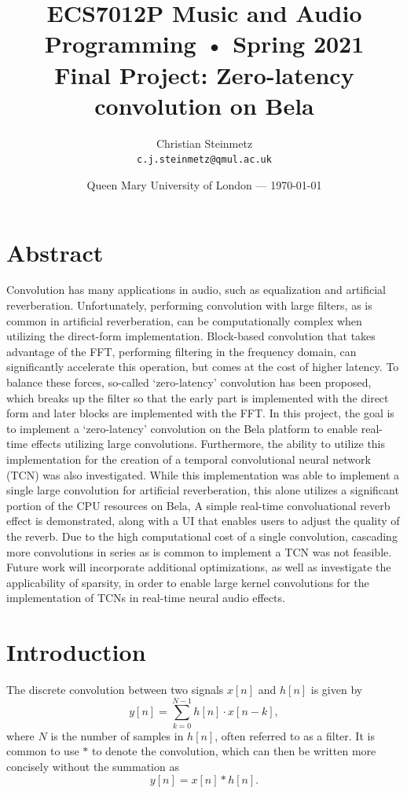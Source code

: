 \documentclass{article}
\title{ \large ECS7012P Music and Audio Programming • Spring 2021 \\ \huge Final Project: Zero-latency convolution on Bela} %
\author{Christian Steinmetz\\ \texttt{c.j.steinmetz@qmul.ac.uk}} %
\date{Queen Mary University of London --- \today} %
\begin{document}
  

\maketitle %

\section*{Abstract} 

Convolution has many applications in audio, such as equalization and artificial reverberation.
Unfortunately, performing convolution with large filters, as is common in artificial reverberation, 
can be computationally complex when utilizing the direct-form implementation. 
Block-based convolution that takes advantage of the FFT, performing filtering in the frequency domain,
can significantly accelerate this operation, but comes at the cost of higher latency. 
To balance these forces, so-called `zero-latency' convolution has been proposed,
which breaks up the filter so that the early part is implemented with the direct form and later blocks are implemented with the FFT. 
In this project, the goal is to implement a `zero-latency' convolution on the Bela platform to enable real-time effects utilizing large convolutions. 
Furthermore, the ability to utilize this implementation for the creation of a temporal convolutional neural network (TCN) was also investigated. 
While this implementation was able to implement a single large convolution for artificial reverberation,
this alone utilizes a significant portion of the CPU resources on Bela, 
A simple real-time convoluational reverb effect is demonstrated, 
along with a UI that enables users to adjust the quality of the reverb.
Due to the high computational cost of a single convolution, cascading more convolutions in series as is common to implement a TCN was not feasible. 
Future work will incorporate additional optimizations, as well as investigate the applicability of sparsity,
in order to enable large kernel convolutions for the implementation of TCNs in real-time neural audio effects.

\section{Introduction}\label{sec:intro}

The discrete convolution between two signals $x[n]$ and $h[n]$ is given by
\begin{equation*}
    y[n] = \sum_{k=0}^{N-1} h[n] \cdot x[n-k],
\end{equation*}
where $N$ is the number of samples in $h[n]$, often referred to as a filter.
It is common to use $*$ to denote the convolution, 
which can then be written more concisely without the summation as 
\begin{equation*}
    y[n] = x[n] * h[n].
\end{equation*}
\end{document}
